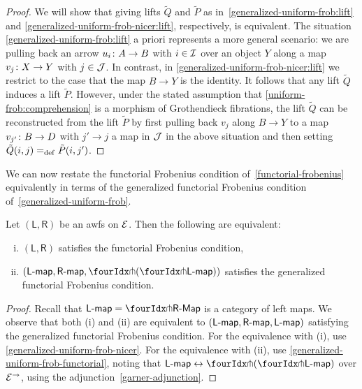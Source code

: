 \documentclass[reqno,10pt,a4paper,oneside,draft]{amsart}
\newcommand{\LL}{\mathsf{L}}
\newcommand{\RR}{\mathsf{R}}
\begin{document}
{{\begin{proof}
We will show that giving lifts $\tilde{Q}$ and $\tilde{P}$ as in~\eqref{generalized-uniform-frob:lift} and \eqref{generalized-uniform-frob-nicer:lift}, respectively, is equivalent.
The situation \eqref{generalized-uniform-frob:lift} a priori represents a more general scenario: we are pulling back an arrow $u_i \co A \to B$ with $i \in \cal{I}$ over an object $Y$ along a map $v_j \co X \to Y$ with $j \in \cal{J}$.
In contrast, in \eqref{generalized-uniform-frob-nicer:lift} we restrict to the case that the map $B \to Y$ is the identity.
It follows that any lift $\tilde{Q}$ induces a lift $\tilde{P}$.
However, under the stated assumption that \eqref{uniform-frob:comprehension} is a morphism of Grothendieck fibrations, the lift $\tilde{Q}$ can be reconstructed from the lift $\tilde{P}$ by first pulling back $v_j$ along $B \to Y$ to a map $v_{j'} \co B \to D$ with $j' \to j$ a map in $\cal{J}$ in the above situation and then setting $\tilde{Q}(i, j) \defeq \tilde{P}(i, j')$.
\end{proof}

We can now restate the functorial Frobenius condition of~\cref{functorial-frobenius} equivalently in terms of the generalized functorial Frobenius condition of~\cref{generalized-uniform-frob}.

\begin{proposition} \label{thm:alt-frob}
Let $(\mathsf{L}, \mathsf{R})$ be an awfs on $\cal{E}$.
Then the following are equivalent:
\begin{enumerate}[(i)]
\item $(\LL, \RR)$ satisfies the functorial Frobenius condition,
\item $(\pcoalg{\LL}, \palg{\RR}, \liftl{(\liftr{\pcoalg{\LL}})})$ satisfies the generalized functorial Frobenius condition.
\end{enumerate}
\end{proposition}

\begin{proof}
Recall that $\pcoalg{\LL} = \liftl{\pAlg{\RR}}$ is a category of left maps.
We observe that both (i) and (ii) are equivalent to $(\pcoalg{\LL}, \palg{\RR}, \pcoalg{\LL})$ satisfying the generalized functorial Frobenius condition.
For the equivalence with (i), use \cref{generalized-uniform-frob-nicer}.
For the equivalence with (ii), use \cref{generalized-uniform-frob-functorial}, noting that
$\pcoalg{\LL} \leftrightarrow \liftl{(\liftr{\pcoalg{\LL}})}$ over $\cal{E}^\to$, using the adjunction~\eqref{garner-adjunction}.
\end{proof}

}}
\end{document}
